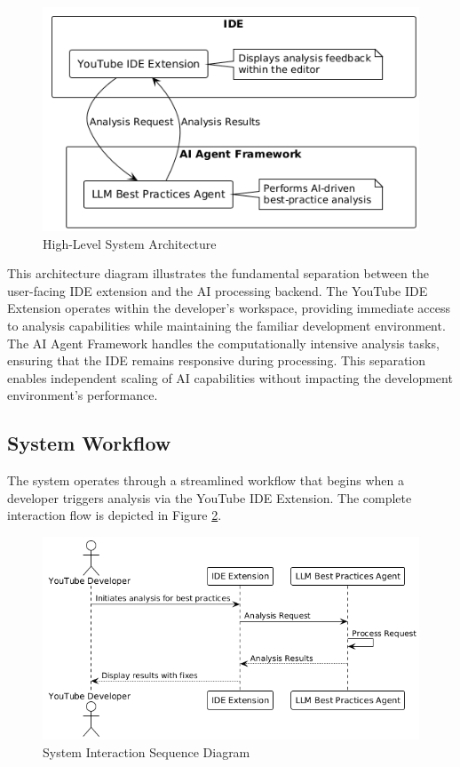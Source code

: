\begin{spacing}{1.2}
\begin{figure}[H]
\centering
\includegraphics[scale=0.7]{images/high_level_system_architecture.png}
\caption{High-Level System Architecture}
\label{fig:system_architecture}
\end{figure}

This architecture diagram illustrates the fundamental separation between the user-facing IDE extension and the AI processing backend. The YouTube IDE Extension operates within the developer's workspace, providing immediate access to analysis capabilities while maintaining the familiar development environment. The AI Agent Framework handles the computationally intensive analysis tasks, ensuring that the IDE remains responsive during processing. This separation enables independent scaling of AI capabilities without impacting the development environment's performance.

\subsection{System Workflow}
The system operates through a streamlined workflow that begins when a developer triggers analysis via the YouTube IDE Extension. The complete interaction flow is depicted in Figure \ref{fig:sequence_diagram}.

\begin{figure}[H]
\centering
\includegraphics[scale=0.7]{images/sequence_diagram.png}
\caption{System Interaction Sequence Diagram}
\label{fig:sequence_diagram}
\end{figure}


\end{spacing}
